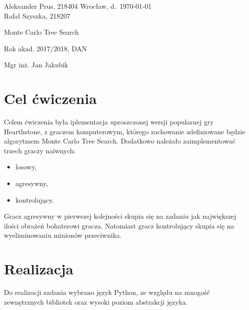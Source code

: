 \documentclass[a4paper, 12pt]{article}
\begin{document}
\thispagestyle{empty}
\noindent Aleksander Prus, 218404 \hfill Wrocław, d.\ \today
\\ Rafał Szyszka, 218207

\vfill

\begin{center}
    \begin{Huge}
        Monte Carlo Tree Search\\
    \end{Huge}
\end{center}

\begin{center}
    Rok akad. 2017/2018, DAN
\end{center}

\vspace{0.2ex}

\begin{flushright}
    \begin{minipage}[t]{0.4\columnwidth}
        \noindent Mgr inż. Jan Jakubik
    \end{minipage}
\end{flushright}

\vfill
\newpage
\tableofcontents
\newpage
\section{Cel ćwiczenia}
Celem ćwiczenia była iplementacja uproszczonej wersji popularnej gry Hearthstone, z graczem komputerowym, którego zachowanie zdefiniowane będzie algorytmem Monte Carlo Tree Search. Dodatkowo należało zaimplementować trzech graczy naiwnych:
\begin{itemize}
\item losowy,
\item agresywny,
\item kontrolujący.
\end{itemize}

Gracz agresywny w pierwszej kolejności skupia się na zadaniu jak największej ilości obrażeń bohaterowi gracza. Natomiast gracz kontrolujący skupia się na wyeliminowaniu minionów przeciwnika.


\section{Realizacja}
Do realizacji zadania wybrano język Python, ze względu na mnogość zewnętrznych bibliotek oraz wysoki poziom abstrakcji języka.
\end{document}

